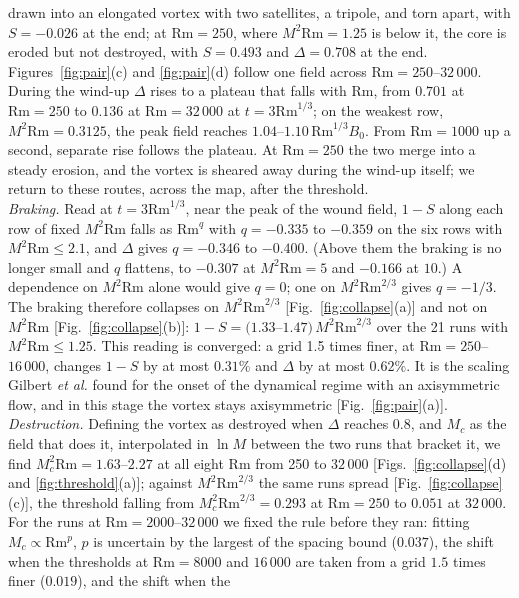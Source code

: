 \documentclass[aps,prl,twocolumn,reprint,amsmath,amssymb,superscriptaddress,floatfix]{revtex4-2}
\newcommand{\Rm}{\mathrm{Rm}}
\begin{document}
drawn into an elongated vortex with two satellites, a tripole, and torn apart,
with $S=-0.026$ at the end; at $\Rm=250$, where $M^2\Rm=1.25$ is below it, the
core is eroded but not destroyed, with $S=0.493$ and $\Delta=0.708$ at the end.
Figures~\ref{fig:pair}(c) and \ref{fig:pair}(d) follow one field across
$\Rm=250$--$32\,000$. During the wind-up $\Delta$ rises to a plateau that falls with
$\Rm$, from $0.701$ at $\Rm=250$ to $0.136$ at $\Rm=32\,000$ at $t=3\Rm^{1/3}$; on
the weakest row, $M^2\Rm=0.3125$, the peak field reaches
$1.04$--$1.10\,\Rm^{1/3}B_0$. From $\Rm=1000$ up a second, separate rise follows
the plateau. At $\Rm=250$ the two merge into a steady erosion, and the vortex is
sheared away during the wind-up itself; we return to these routes, across the
map, after the threshold.\\
\indent \textit{Braking.} Read at $t=3\Rm^{1/3}$, near the peak of the wound field,
$1-S$ along each row of fixed $M^2\Rm$ falls as $\Rm^q$ with $q=-0.335$ to
$-0.359$ on the six rows with $M^2\Rm\le2.1$, and $\Delta$ gives $q=-0.346$ to
$-0.400$. (Above them the braking is no longer small and $q$ flattens, to
$-0.307$ at $M^2\Rm=5$ and $-0.166$ at $10$.) A dependence on $M^2\Rm$ alone would
give $q=0$; one on $M^2\Rm^{2/3}$ gives $q=-1/3$. The braking therefore collapses on
$M^2\Rm^{2/3}$ [Fig.~\ref{fig:collapse}(a)] and not on $M^2\Rm$
[Fig.~\ref{fig:collapse}(b)]: $1-S=(1.33$--$1.47)\,M^2\Rm^{2/3}$ over the 21 runs
with $M^2\Rm\le1.25$. This reading is converged: a grid 1.5 times finer, at
$\Rm=250$--$16\,000$, changes $1-S$ by at most $0.31\%$ and $\Delta$ by at most
$0.62\%$. It is the scaling
Gilbert \textit{et al.} \cite{gilbert2016} found for the onset of the dynamical
regime with an axisymmetric flow, and in this stage the vortex stays axisymmetric
[Fig.~\ref{fig:pair}(a)].\\
\indent \textit{Destruction.} Defining the vortex as destroyed when $\Delta$ reaches
$0.8$, and $M_c$ as the field that does it, interpolated in $\ln M$ between the
two runs that bracket it, we find $M_c^2\Rm=1.63$--$2.27$ at all eight $\Rm$
from 250 to $32\,000$ [Figs.~\ref{fig:collapse}(d) and
\ref{fig:threshold}(a)]; against $M^2\Rm^{2/3}$ the same runs spread
[Fig.~\ref{fig:collapse}(c)], the threshold falling from $M_c^2\Rm^{2/3}=0.293$ at
$\Rm=250$ to $0.051$ at $32\,000$. For the runs at $\Rm=2000$--$32\,000$ we fixed the rule
before they ran: fitting $M_c\propto\Rm^p$, $p$ is uncertain by the largest of
the spacing bound ($0.037$), the shift when the thresholds at $\Rm=8000$ and
$16\,000$ are taken from a grid $1.5$ times finer ($0.019$), and the shift when the
\end{document}
